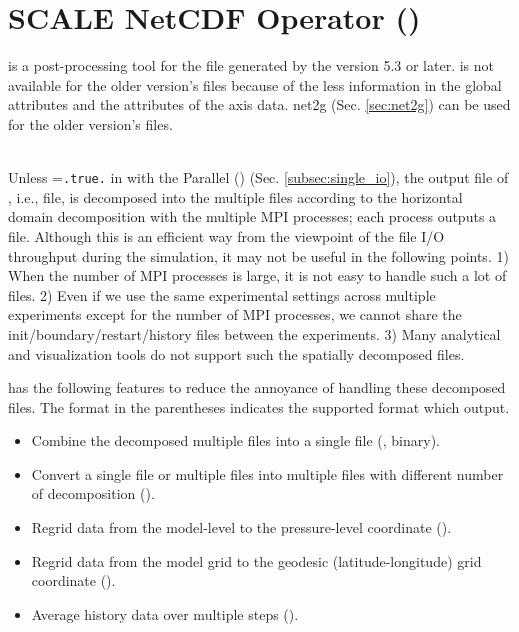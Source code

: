 \section{SCALE NetCDF Operator (\sno)} \label{sec:sno}

 \hrulefill

\sno is a post-processing tool for the \scalenetcdf file generated by the \scalelib version 5.3 or later.
\sno is not available for the older version's \scalenetcdf files because of the less information in the global attributes and the attributes of the axis data.
net2g (Sec. \ref{sec:net2g}) can be used for the older version's \scalenetcdf files.

\hrulefill\\


Unless =\verb|.true.| in  with the Parallel \netcdf (\pnetcdf) (Sec. \ref{subsec:single_io}),
the output file of \scalerm, i.e., \scalenetcdf file, is decomposed into the multiple files according to the horizontal domain decomposition with the multiple MPI processes; each process outputs a file.
Although this is an efficient way from the viewpoint of the file I/O throughput during the simulation, it may not be useful in the following points.
%
1) When the number of MPI processes is large, it is not easy to handle such a lot of files.
2) Even if we use the same experimental settings across multiple experiments except for the number of MPI processes, we cannot share the init/boundary/restart/history files between the experiments.
3) Many analytical and visualization tools do not support such the spatially decomposed files.


\sno has the following features to reduce the annoyance of handling these decomposed files.
The format in the parentheses indicates the supported format which \sno output.
\begin{itemize}
 \item Combine the decomposed multiple files into a single file (\scalenetcdf, \grads binary).
 \item Convert a single file or multiple files into multiple files with different number of decomposition (\scalenetcdf).
 \item Regrid data from the model-level to the pressure-level coordinate (\scalenetcdf).
 \item Regrid data from the model grid to the geodesic (latitude-longitude) grid coordinate (\scalenetcdf).
 \item Average history data over multiple steps (\scalenetcdf).
\end{itemize}



